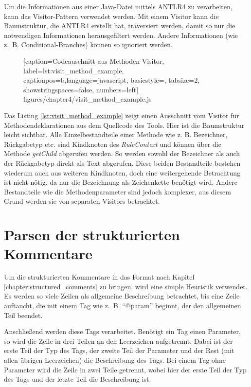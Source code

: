 Um die Informationen aus einer Java-Datei mittels ANTLR4 zu verarbeiten, kann das Visitor-Pattern verwendet werden. Mit einem Visitor kann die Baumstruktur, die ANTLR4 erstellt hat, traversiert werden, damit so nur die notwendigen Informationen herausgefiltert werden. Andere Informationen (wie z.~B. Conditional-Branches) können so ignoriert werden.  
		\begin{figure} [htbp]
			
			[caption={Codeauschnitt aus  Methoden-Visitor},
			label={lst:visit_method_example},
			captionpos=b,language=javascript, basicstyle=\footnotesize, tabsize=2, showstringspaces=false,  numbers=left]
			{figures/chapter4/visit_method_example.js}
		\end{figure}
Das Listing \ref{lst:visit_method_example} zeigt einen Ausschnitt vom Visitor für Methodendeklarationen aus dem Quellcode des Tools. Hier ist die Baumstruktur leicht sichtbar. Alle Einzelbestandteile einer Methode wie z. B. Bezeichner, Rückgabetyp etc. sind Kindknoten des \textit{RuleContext} und können über die Methode \textit{getChild} abgerufen werden. So werden sowohl der Bezeichner als auch der Rückgabetyp direkt als Text abgerufen. Diese  beiden Bestandteile bestehen wiederum auch aus weiteren Kindknoten, doch eine weitergehende Betrachtung ist nicht nötig, da nur die Bezeichnung als Zeichenkette benötigt wird. Andere Bestandteile wie die Methodenparameter sind jedoch komplexer, aus diesem Grund werden sie von separaten Visitors betrachtet.

\section{Parsen der strukturierten Kommentare}\label{chapter:comment_parsing}
Um die strukturierten Kommentare in das Format nach Kapitel \ref{chapter:structured_comments} zu bringen, wird eine simple Heuristik verwendet. Es werden so viele Zeilen als allgemeine Beschreibung betrachtet, bis eine Zeile auftaucht, die mit einem Tag wie z.~B. \enquote{@param} beginnt, der den allgemeinen Teil beendet.

Anschließend werden diese Tags verarbeitet. Benötigt ein Tag einen Parameter, so wird die Zeile in drei Teilen an den Leerzeichen aufgetrennt. Dabei ist der erste Teil der Typ des Tags, der zweite Teil der Parameter und der Rest (mit allen übrigen Leerzeichen) die Beschreibung des Tags.
Bei einem Tag ohne Parameter wird die Zeile in zwei Teile getrennt, wobei hier der erste Teil der Typ des Tags und der letzte Teil die Beschreibung ist.

